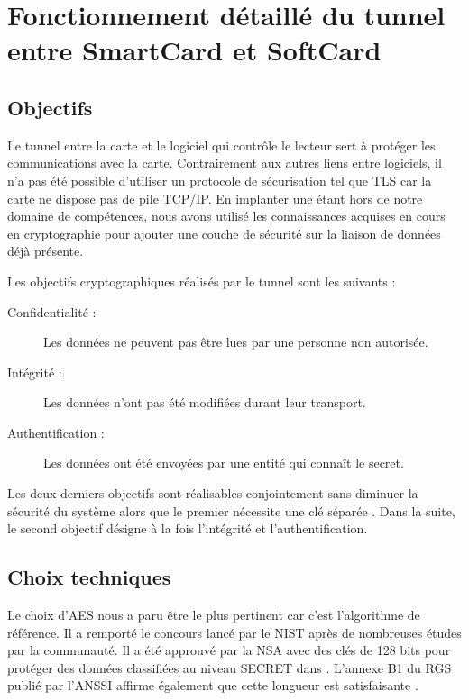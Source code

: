 \documentclass[a4paper,11pt,french]{article}
\begin{document}
\appendix

\section{Fonctionnement détaillé du tunnel entre SmartCard et SoftCard}
\label{TunnelSS}


\subsection{Objectifs}
Le tunnel entre la carte et le logiciel qui contr\^ole le lecteur sert à 
protéger les communications avec la carte. Contrairement aux autres liens entre 
logiciels, il n'a pas été possible d'utiliser un protocole de sécurisation tel 
que TLS car la carte ne dispose pas de pile TCP/IP. En implanter une étant hors
de notre domaine de compétences, nous avons utilisé les connaissances acquises 
en cours en cryptographie pour ajouter une couche de sécurité sur la liaison de 
données déjà présente. 

Les objectifs cryptographiques réalisés par le tunnel sont les suivants : 
\begin{description}
    \item[Confidentialité :] Les données ne peuvent pas être lues par une 
        personne non autorisée.
    \item[Intégrité :] Les données n'ont pas été modifiées durant leur 
        transport.
    \item[Authentification :] Les données ont été envoyées par une entité qui 
        connaît le secret.
\end{description}
Les deux derniers objectifs sont réalisables conjointement sans diminuer la 
sécurité du système alors que le premier nécessite une clé séparée \cite[section
2.5.1]{RGS ANSSI}. Dans la suite, le second objectif désigne à la fois 
l'intégrité et l'authentification. 


\subsection{Choix techniques}
Le choix d'AES nous a paru être le plus pertinent car c'est l'algorithme de 
référence. Il a remporté le concours lancé par le NIST après de nombreuses 
études par la communauté. Il a été approuvé par la NSA avec des clés de 128
bits pour protéger des données classifiées au niveau SECRET dans \cite{NSA}. 
L'annexe B1 du RGS publié par l'ANSSI affirme également que cette longueur est
satisfaisante \cite{RGS ANSSI}. 
\end{document}

